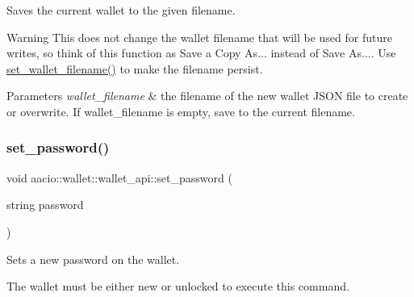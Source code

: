 Saves the current wallet to the given filename.

\begin{DoxyWarning}{Warning}
This does not change the wallet filename that will be used for future writes, so think of this function as \textquotesingle{}Save a Copy As...\textquotesingle{} instead of \textquotesingle{}Save As...\textquotesingle{}. Use {\ttfamily \mbox{\hyperlink{classaacio_1_1wallet_1_1wallet__api_a208875f33af3cb0ec88e316c813f0ec8}{set\+\_\+wallet\+\_\+filename()}}} to make the filename persist. 
\end{DoxyWarning}

\begin{DoxyParams}{Parameters}
{\em wallet\+\_\+filename} & the filename of the new wallet J\+S\+ON file to create or overwrite. If {\ttfamily wallet\+\_\+filename} is empty, save to the current filename. \\
\hline
\end{DoxyParams}
\mbox{\label{classaacio_1_1wallet_1_1wallet__api_a9b9c6db62baab3c4f2476823573d57ce}} 
\subsubsection{\texorpdfstring{set\+\_\+password()}{set\_password()}}
{\footnotesize\ttfamily void aacio\+::wallet\+::wallet\+\_\+api\+::set\+\_\+password (\begin{DoxyParamCaption}\item[{string}]{password }\end{DoxyParamCaption})}

Sets a new password on the wallet.

The wallet must be either \textquotesingle{}new\textquotesingle{} or \textquotesingle{}unlocked\textquotesingle{} to execute this command. \mbox{\label{classaacio_1_1wallet_1_1wallet__api_a208875f33af3cb0ec88e316c813f0ec8}} 
